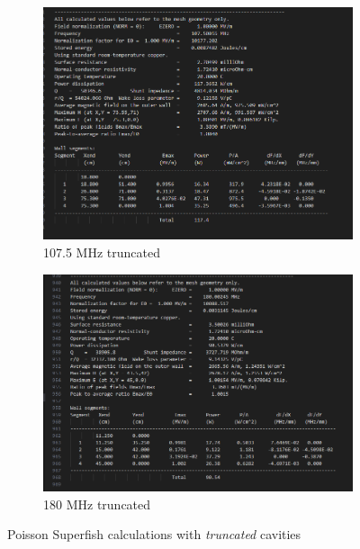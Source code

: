 \documentclass[a4paper,oneside,12pt]{report}
\numberwithin{equation}{chapter}
\begin{document}
\begin{figure}[H]
    \centering
    \begin{subfigure}{.5\textwidth}
      \centering
      \includegraphics[width=0.95\linewidth]{./figures/superfish/superfish107mod_z.png}
      \caption{107.5 MHz truncated}
    \end{subfigure}%
    \begin{subfigure}{.5\textwidth}
      \centering
      \includegraphics[width=\linewidth]{./figures/superfish/superfish180mod_z.png}
      \caption{180 MHz truncated}
    \end{subfigure}
    \caption{Poisson Superfish calculations with \textit{truncated} cavities}
    \label{fig:180_cavity_shunt_diff}
\end{figure}
    
\end{document}
